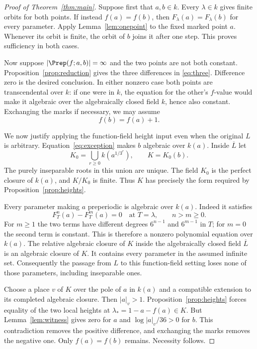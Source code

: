 \begin{proof}[Proof of Theorem~\ref{thm:main}]
Suppose first that $a,b\in k$. Every $\lambda\in k$ gives finite
orbits for both points. If instead $f(a)=f(b)$, then
$F_\lambda(a)=F_\lambda(b)$ for every parameter. Apply
Lemma~\ref{lem:onepoint} to the fixed marked point $a$.
Whenever its orbit is finite, the orbit of $b$ joins it after one
step. This proves sufficiency in both cases.

Now suppose $|\Prep(f;a,b)|=\infty$ and the two points are not
both constant. Proposition~\ref{prop:reduction} gives the three
differences in \eqref{eq:three}. Difference zero is the desired
conclusion. In either nonzero case both points are transcendental
over $k$: if one were in $k$, the equation for the other's
$f$-value would make it algebraic over the algebraically closed
field $k$, hence also constant. Exchanging the marks if necessary,
we may assume
\begin{equation}\label{eq:exception}
 f(b)=f(a)+1.
\end{equation}

We now justify applying the function-field height input even when
the original $L$ is arbitrary. Equation~\eqref{eq:exception} makes
$b$ algebraic over $k(a)$. Inside $\overline L$ let
\begin{equation}\label{eq:K}
 K_0=\bigcup_{r\ge0}k(a^{1/3^r}),\qquad K=K_0(b).
\end{equation}
The purely inseparable roots in this union are unique. The field
$K_0$ is the perfect closure of $k(a)$, and $K/K_0$ is finite.
Thus $K$ has precisely the form required by
Proposition~\ref{prop:heights}.

Every parameter making $a$ preperiodic is algebraic over $k(a)$.
Indeed it satisfies
\[
 F_T^n(a)-F_T^m(a)=0
 \quad\text{at }T=\lambda,\qquad n>m\ge0.
\]
For $m\ge1$ the two terms have different degrees $6^{n-1}$ and
$6^{m-1}$ in $T$; for $m=0$ the second term is constant.
This is therefore a nonzero polynomial equation over $k(a)$.
The relative algebraic closure of $K$ inside the algebraically
closed field $\overline L$ is an algebraic closure of $K$.
It contains every parameter in the assumed infinite set.
Consequently the passage from $L$ to this function-field setting
loses none of those parameters, including inseparable ones.

Choose a place $v$ of $K$ over the pole of $a$ in $k(a)$ and a
compatible extension to its completed algebraic closure. Then
$|a|_v>1$. Proposition~\ref{prop:heights} forces equality of the
two local heights at $\lambda_*=1-a-f(a)\in K$. But
Lemma~\ref{lem:witness} gives zero for $a$ and
$\log|a|_v/36>0$ for $b$. This contradiction removes the positive
difference, and exchanging the marks removes the negative one.
Only $f(a)=f(b)$ remains. Necessity follows.
\end{proof}
